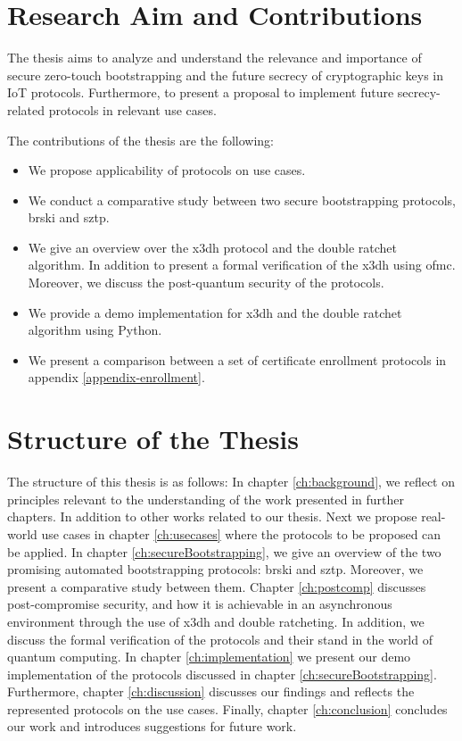 \section{Research Aim and Contributions}\label{sec:reserach_questions}
The thesis aims to analyze and understand the relevance and importance of secure zero-touch bootstrapping and the future secrecy of cryptographic keys in IoT protocols. Furthermore, to present a proposal to implement future secrecy-related protocols in relevant use cases.
\par
The contributions of the thesis are the following:
\begin{itemize}
	\item We propose  applicability of protocols on use cases.
	\item We conduct a comparative study between two secure bootstrapping protocols, \gls{brski} and \gls{sztp}.
	\item We give an overview over the \gls{x3dh} protocol and the double ratchet algorithm. In addition to present a formal verification of the \gls{x3dh} using \gls{ofmc}. Moreover, we discuss the post-quantum security of the protocols.
	\item We provide a demo implementation for \gls{x3dh} and the double ratchet algorithm using Python.
	\item We present a comparison between a set of certificate enrollment protocols in appendix \ref{appendix-enrollment}.
\end{itemize}

\section{Structure of the Thesis}\label{sec:structure_of_the_thesis}

The structure of this thesis is as follows: In chapter \ref{ch:background}, we reflect on principles relevant to the understanding of the work presented in further chapters. In addition to other works related to our thesis. 
Next we propose real-world use cases in chapter \ref{ch:usecases} where the protocols to be proposed can be applied.
In chapter \ref{ch:secureBootstrapping}, we give an overview of the two promising automated bootstrapping protocols: \gls{brski} and \gls{sztp}. Moreover, we present a comparative study between them.
Chapter \ref{ch:postcomp} discusses post-compromise security, and how it is achievable in an asynchronous environment through the use of \gls{x3dh} and double ratcheting. In addition, we discuss the formal verification of the protocols and their stand in the world of quantum computing.
In chapter \ref{ch:implementation} we present our demo implementation of the protocols discussed in chapter \ref{ch:secureBootstrapping}. 
Furthermore, chapter \ref{ch:discussion} discusses our findings and reflects the represented protocols on the use cases.
Finally, chapter \ref{ch:conclusion} concludes our work and introduces suggestions for future work.